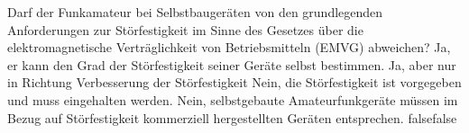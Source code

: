     {Darf der Funkamateur bei Selbstbaugeräten von den grundlegenden Anforderungen zur Störfestigkeit im Sinne des Gesetzes über die elektromagnetische Verträglichkeit von Betriebsmitteln (EMVG) abweichen?}
    {Ja, er kann den Grad der Störfestigkeit seiner Geräte selbst bestimmen.}
    {Ja, aber nur in Richtung Verbesserung der Störfestigkeit}
    {Nein, die Störfestigkeit ist vorgegeben und muss eingehalten werden.}
    {Nein, selbstgebaute Amateurfunkgeräte müssen im Bezug auf Störfestigkeit  kommerziell hergestellten Geräten entsprechen.}
    {false}{false}